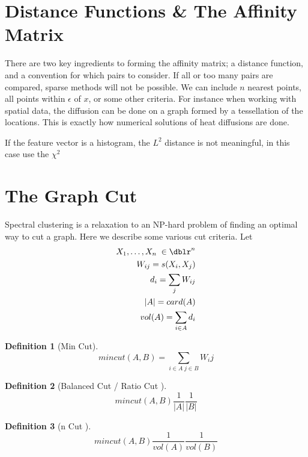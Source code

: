 \documentclass[a4paper]{article}
\theoremstyle{plain}
\theoremstyle{definition}
\newtheorem{defn}{Definition}[section]
\theoremstyle{remark}
\numberwithin{equation}{section}
\begin{document}
\section{Distance Functions \& The Affinity Matrix}

There are two key ingredients to forming the affinity matrix; a distance function, and a convention for which pairs to consider.  If all or too many pairs are compared, sparse methods will not be possible.  We can include $n$ nearest points, all points within $\epsilon$ of $x$, or some other criteria. For instance when working with spatial data, the diffusion can be done on a graph formed by a tessellation of the locations.  This is exactly how numerical solutions of heat diffusions are done.

If the feature vector is a histogram, the $L^2$ distance is not meaningful, in this case use the $\chi^2$

\section{The Graph Cut}
Spectral clustering is a relaxation to an NP-hard problem of finding an optimal way to cut a graph. Here we describe some various cut criteria.  Let
\begin{eqnarray*}
X_1, \hdots , X_n \; \in \dblr^n  \\
W_{ij} = s(X_i,X_j) \\
d_i = \sum_{j} W_{i j}\\
|A| = card (A) \\
vol(A) = \sum_{i \in A} d_i
\end{eqnarray*}

\begin{defn}[Min Cut]
\begin{equation*} min cut(A,B) =\sum_{i \in A \; j \in B}  W_ij \end{equation*}
\end{defn}

\begin{defn}[Balanced Cut / Ratio Cut ]
\begin{equation*} min cut (A,B) \frac{1}{|A|} \frac{1}{|B|} \end{equation*}
\end{defn}
\begin{defn}[n Cut ]
\begin{equation*} min cut (A,B) \frac{1}{vol(A)} \frac{1}{vol(B)} \end{equation*}
\end{defn}
\end{document}
